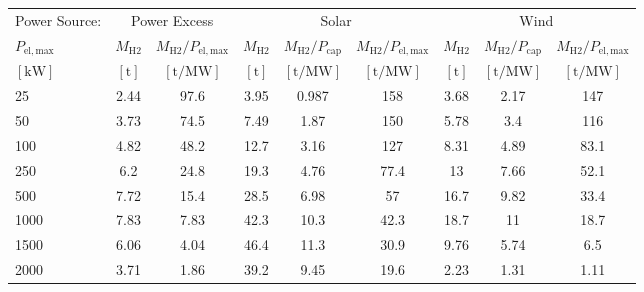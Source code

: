 \begin{table}
\label{tab: VaryElectrolyser}
\begin{tabular}{l|cc|ccc|ccc}
\toprule
Power Source: & \multicolumn{2}{|c}{Power Excess} & \multicolumn{3}{|c}{Solar} & \multicolumn{3}{|c}{Wind} \\
$P_{\mathrm{el,max}}$ & $M_{\mathrm{H2}}$ & $M_{\mathrm{H2}}/P_{\mathrm{el,max}}$ & $M_{\mathrm{H2}}$ & $M_{\mathrm{H2}}/P_{\mathrm{cap}}$ & $M_{\mathrm{H2}}/P_{\mathrm{el,max}}$ & $M_{\mathrm{H2}}$ & $M_{\mathrm{H2}}/P_{\mathrm{cap}}$ & $M_{\mathrm{H2}}/P_{\mathrm{el,max}}$ \\
$\left[\mathrm{kW}\right]$ & $\left[\mathrm{t}\right]$ & $\left[\mathrm{t/MW}\right]$ & $\left[\mathrm{t}\right]$ & $\left[\mathrm{t/MW}\right]$ & $\left[\mathrm{t/MW}\right]$ & $\left[\mathrm{t}\right]$ & $\left[\mathrm{t/MW}\right]$ & $\left[\mathrm{t/MW}\right]$ \\
\midrule
25 & 2.44 & 97.6 & 3.95 & 0.987 & 158 & 3.68 & 2.17 & 147 \\
50 & 3.73 & 74.5 & 7.49 & 1.87 & 150 & 5.78 & 3.4 & 116 \\
100 & 4.82 & 48.2 & 12.7 & 3.16 & 127 & 8.31 & 4.89 & 83.1 \\
250 & 6.2 & 24.8 & 19.3 & 4.76 & 77.4 & 13 & 7.66 & 52.1 \\
500 & 7.72 & 15.4 & 28.5 & 6.98 & 57 & 16.7 & 9.82 & 33.4 \\
1000 & 7.83 & 7.83 & 42.3 & 10.3 & 42.3 & 18.7 & 11 & 18.7 \\
1500 & 6.06 & 4.04 & 46.4 & 11.3 & 30.9 & 9.76 & 5.74 & 6.5 \\
2000 & 3.71 & 1.86 & 39.2 & 9.45 & 19.6 & 2.23 & 1.31 & 1.11 \\
\bottomrule
\end{tabular}
\end{table}
